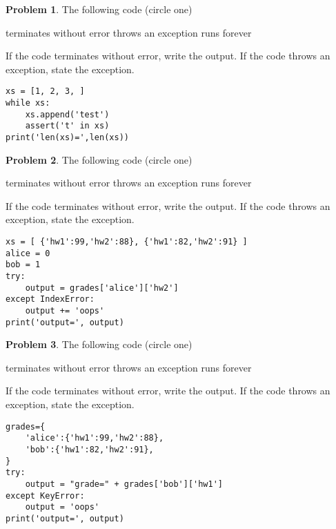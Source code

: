 \documentclass[10pt]{article}
\theoremstyle{definition}
\newtheorem{problem}{Problem}
\begin{document}
\newpage
\begin{problem}
    The following code (circle one)

    \vspace{0.25in}
    \hspace{0.5in}terminates without error 
    \hspace{1in}throws an exception
    \hspace{1in}runs forever
    \vspace{0.25in}

    \noindent
    If the code terminates without error, write the output.
    If the code throws an exception, state the exception.
\end{problem}
\begin{lstlisting}
xs = [1, 2, 3, ]
while xs:
    xs.append('test')
    assert('t' in xs)
print('len(xs)=',len(xs))
\end{lstlisting}
\vspace{2in}


\begin{problem}
    The following code (circle one)

    \vspace{0.25in}
    \hspace{0.5in}terminates without error 
    \hspace{1in}throws an exception
    \hspace{1in}runs forever
    \vspace{0.25in}

    \noindent
    If the code terminates without error, write the output.
    If the code throws an exception, state the exception.
\end{problem}
\begin{lstlisting}
xs = [ {'hw1':99,'hw2':88}, {'hw1':82,'hw2':91} ]
alice = 0
bob = 1
try:
    output = grades['alice']['hw2']
except IndexError:
    output += 'oops'
print('output=', output)
\end{lstlisting}
\vspace{1in}

\newpage
\begin{problem}
    The following code (circle one)

    \vspace{0.25in}
    \hspace{0.5in}terminates without error 
    \hspace{1in}throws an exception
    \hspace{1in}runs forever
    \vspace{0.25in}

    \noindent
    If the code terminates without error, write the output.
    If the code throws an exception, state the exception.
\end{problem}
\begin{lstlisting}
grades={
    'alice':{'hw1':99,'hw2':88},
    'bob':{'hw1':82,'hw2':91},
}
try:
    output = "grade=" + grades['bob']['hw1']
except KeyError:
    output = 'oops'
print('output=', output)
\end{lstlisting}
\vspace{2in}
\end{document}

